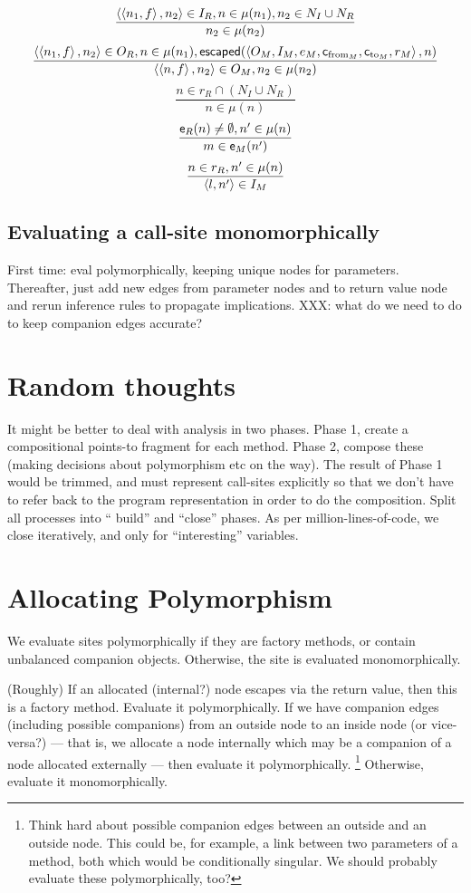 \documentclass[11pt,notitlepage]{article}
\newcommand{\func}[1]{\ensuremath{\text{\sffamily #1}}}
\begin{document}
\[\dfrac
{\left\langle \left\langle n_1,f \right\rangle,n_2 \right\rangle\in I_R,
  n\in\mu(n_1),
  n_2\in N_I\cup N_R}
{n_2\in\mu(n_2)}
\]
\[\dfrac
{\tuple{\tuple{n_1,f},n_2}\in O_R,
 n\in\mu(n_1),
 \func{escaped}(
\tuple{O_M, I_M, e_M, \func{c}_{\text{from}_M}, \func{c}_{\text{to}_M}, r_M}
 ,n) }
{\tuple{\tuple{n,f},n_2}\in O_M,
 n_2\in\mu(n_2) }
\]
\[\dfrac
{n\in r_R\cap\left(N_I\cup N_R\right)}
{n\in\mu(n)}
\]
\[\dfrac
{\func{e}_R(n)\neq\emptyset,
 n'\in\mu(n)}
{m\in\func{e}_M(n')}
\]
\[\dfrac
{n\in r_R, n'\in\mu(n)}
{\left\langle l,n' \right\rangle\in I_M}
\]

\subsection{Evaluating a call-site monomorphically}

First time: eval polymorphically, keeping unique nodes for
parameters.  Thereafter, just add new edges from parameter nodes and
to return value node and rerun inference rules to propagate implications.
XXX: what do we need to do to keep companion edges accurate?

\section{Random thoughts}
It might be better to deal with analysis in two phases.  Phase 1,
create a compositional points-to fragment for each method.  Phase 2,
compose these (making decisions about polymorphism etc on the way).
The result of Phase 1 would be trimmed, and must represent call-sites
explicitly so that we don't have to refer back to the program
representation in order to do the composition.  Split all processes
into `` build'' and ``close'' phases.  As per million-lines-of-code,
we close iteratively, and only for ``interesting'' variables.

\section{Allocating Polymorphism}

We evaluate sites polymorphically if they are factory methods, or
contain unbalanced companion objects.  Otherwise, the site is
evaluated monomorphically.

(Roughly) If an allocated (internal?) node escapes via the return
value, then this is a factory method.  Evaluate it polymorphically.
If we have companion edges (including possible companions) from
an outside node to an inside node (or vice-versa?) --- that is, we
allocate a node internally which may be a companion of a node allocated
externally --- then evaluate it polymorphically.%
\footnote{Think hard about possible companion edges between an
outside and an outside node.  This could be, for example, a
link between two parameters of a method, both which would be
conditionally singular.  We should probably evaluate these
polymorphically, too?}
Otherwise, evaluate it monomorphically.
\end{document}
